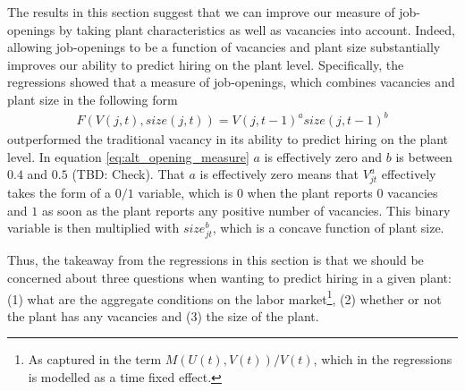 The results in this section suggest that we can improve our measure of job-openings by taking plant characteristics as well as vacancies into account. Indeed, allowing job-openings to be a function of vacancies and plant size substantially improves our ability to predict hiring on the plant level. Specifically, the regressions showed that a measure of job-openings, which combines vacancies and plant size in the following form
\begin{align}
F(V(j,t), size(j,t))=V(j,t-1)^{a} size(j,t-1)^{b}
\label{eq:alt_opening_measure}
\end{align}
outperformed the traditional vacancy in its ability to predict hiring on the plant level. In equation \eqref{eq:alt_opening_measure}
$a$ is effectively zero and $b$ is between $0.4$ and $0.5$ (TBD: Check). That $a$ is effectively zero means that $V_{jt}^{a}$ effectively takes the form of a $0/1$ variable, which is $0$ when the plant reports $0$ vacancies and $1$ as soon as the plant reports any positive number of vacancies. This binary variable is then multiplied with $size_{jt}^{b}$, which is a concave function of plant size. 

Thus, the takeaway from the regressions in this section is that we should be concerned about three questions when wanting to predict hiring in a given plant: (1) what are the aggregate conditions on the labor market\footnote{As captured in the term $M(U(t),V(t))/V(t)$, which in the regressions is modelled as a time fixed effect.}, (2) whether or not the plant has any vacancies and (3) the size of the plant.


